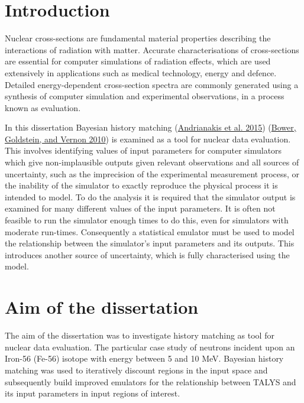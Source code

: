\documentclass[
  12pt,
  a4paper,
  twoside]{book}
\begin{document}
\hypertarget{introduction}{%
\section{Introduction}\label{introduction}}

Nuclear cross-sections are fundamental material properties describing the interactions of radiation with matter. Accurate characterisations of cross-sections are essential for computer simulations of radiation effects, which are used extensively in applications such as medical technology, energy and defence. Detailed energy-dependent cross-section spectra are commonly generated using a synthesis of computer simulation and experimental observations, in a process known as evaluation.

In this dissertation Bayesian history matching (\protect\hyperlink{ref-jeremy_histmatch}{Andrianakis et al. 2015}) (\protect\hyperlink{ref-bower2010galaxy}{Bower, Goldstein, and Vernon 2010}) is examined as a tool for nuclear data evaluation. This involves identifying values of input parameters for computer simulators which give non-implausible outputs given relevant observations and all sources of uncertainty, such as the imprecision of the experimental measurement process, or the inability of the simulator to exactly reproduce the physical process it is intended to model. To do the analysis it is required that the simulator output is examined for many different values of the input parameters. It is often not feasible to run the simulator enough times to do this, even for simulators with moderate run-times. Consequently a statistical emulator must be used to model the relationship between the simulator's input parameters and its outputs. This introduces another source of uncertainty, which is fully characterised using the model.

\hypertarget{Background:aim}{%
\section{Aim of the dissertation}\label{Background:aim}}

The aim of the dissertation was to investigate history matching as tool for nuclear data evaluation. The particular case study of neutrons incident upon an Iron-56 (Fe-56) isotope with energy between 5 and 10 MeV. Bayesian history matching was used to iteratively discount regions in the input space and subsequently build improved emulators for the relationship between TALYS and its input parameters in input regions of interest.
\end{document}
